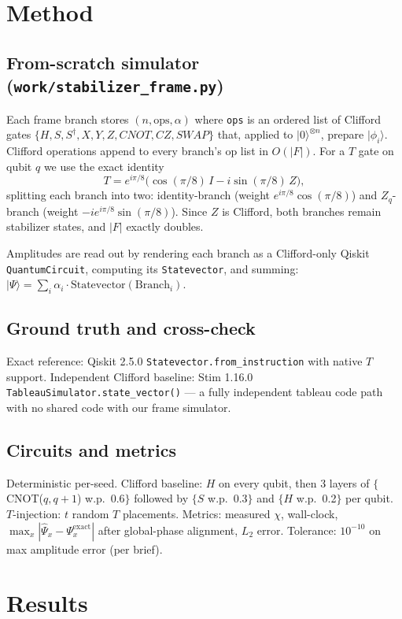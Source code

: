 \documentclass[11pt]{article}
\begin{document}
\section{Method}
\subsection{From-scratch simulator (\texttt{work/stabilizer\_frame.py})}
Each frame branch stores $(n,\text{ops},\alpha)$ where \texttt{ops} is an
ordered list of Clifford gates $\{H,S,S^\dagger,X,Y,Z,CNOT,CZ,SWAP\}$ that,
applied to $|0\rangle^{\otimes n}$, prepare $|\phi_i\rangle$. Clifford
operations append to every branch's op list in $O(|F|)$. For a $T$ gate on
qubit $q$ we use the exact identity
\[
T = e^{i\pi/8}\bigl(\cos(\pi/8)\,I - i\sin(\pi/8)\,Z\bigr),
\]
splitting each branch into two: identity-branch (weight $e^{i\pi/8}\cos(\pi/8)$)
and $Z_q$-branch (weight $-ie^{i\pi/8}\sin(\pi/8)$). Since $Z$ is Clifford, both
branches remain stabilizer states, and $|F|$ exactly doubles.

Amplitudes are read out by rendering each branch as a Clifford-only Qiskit
\texttt{QuantumCircuit}, computing its \texttt{Statevector}, and summing:
$|\Psi\rangle = \sum_i \alpha_i \cdot \text{Statevector}(\text{Branch}_i)$.

\subsection{Ground truth and cross-check}
Exact reference: Qiskit 2.5.0 \texttt{Statevector.from\_instruction} with native
$T$ support. Independent Clifford baseline: Stim 1.16.0
\texttt{TableauSimulator.state\_vector()} --- a fully independent tableau code
path with no shared code with our frame simulator.

\subsection{Circuits and metrics}
Deterministic per-seed. Clifford baseline: $H$ on every qubit, then 3 layers of
$\{$CNOT($q,q{+}1$) w.p.\ 0.6$\}$ followed by $\{S$ w.p.\ 0.3$\}$ and
$\{H$ w.p.\ 0.2$\}$ per qubit. $T$-injection: $t$ random $T$ placements.
Metrics: measured $\chi$, wall-clock, $\max_x|\hat\Psi_x - \Psi^{\text{exact}}_x|$
after global-phase alignment, $L_2$ error. Tolerance: $10^{-10}$ on max amplitude
error (per brief).

\section{Results}
\end{document}
